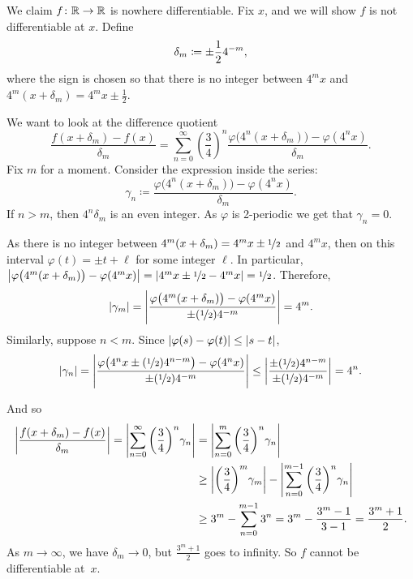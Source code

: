 \begin{example}
We claim $f \colon
{\mathbb{R}} \to {\mathbb{R}}$ is nowhere differentiable.
Fix $x$, and we will show $f$ is not differentiable at $x$.
Define
\begin{equation*}
\delta_m \coloneqq \pm \frac{1}{2} 4^{-m} ,
\avoidbreak
\end{equation*}
where the sign is chosen so that there is no integer
between $4^m x$ and $4^m(x+\delta_m) = 4^m x \pm \frac{1}{2}$.

We want to look at the difference quotient
\begin{equation*}
\frac{f(x+\delta_m)-f(x)}{\delta_m}
=
\sum_{n=0}^\infty 
{\left(\frac{3}{4}\right)}^n
\frac{\varphi\bigl(4^n(x+\delta_m)\bigr)-\varphi(4^nx)}{\delta_m} .
\end{equation*}
Fix $m$ for a moment.  Consider the expression inside the series:
\begin{equation*}
\gamma_{n} \coloneqq
\frac{\varphi\bigl(4^n(x+\delta_m)\bigr)-\varphi(4^nx)}{\delta_m} .
\end{equation*}
If $n > m$, then $4^n\delta_m$ is an even integer.  As $\varphi$
is 2-periodic we get that $\gamma_n = 0$.

As there is no integer between 
$4^m(x+\delta_m) = 4^m x\pm\nicefrac{1}{2}$ and $4^m x$, then on this interval
$\varphi(t) = \pm t + \ell$ for some integer $\ell$.
In particular,
$\left\lvert {\varphi\bigl(4^m(x+ \delta_m)\bigr)-\varphi(4^mx)} \right\rvert =
\left\lvert {4^mx\pm\nicefrac{1}{2}-4^mx} \right\rvert = \nicefrac{1}{2}$.  Therefore,
\begin{equation*}
\lvert {\gamma_m} \rvert =
\left\lvert {
\frac{\varphi\bigl(4^m(x+\delta_m)\bigr)-\varphi(4^mx)}{\pm (\nicefrac{1}{2}) 4^{-m}}
} \right\rvert
= 4^m .
\end{equation*}
Similarly, suppose $n < m$.  Since $\lvert {\varphi(s) -\varphi(t)} \rvert \leq
\lvert {s-t} \rvert$,
\begin{equation*}
\lvert {\gamma_n} \rvert =
\left\lvert {\frac{\varphi\bigl(4^nx\pm(\nicefrac{1}{2})4^{n-m}\bigr)-\varphi(4^nx)}{\pm
(\nicefrac{1}{2}) 4^{-m}}} \right\rvert
\leq
\left\lvert {\frac{\pm(\nicefrac{1}{2})4^{n-m}}{\pm (\nicefrac{1}{2}) 4^{-m}}} \right\rvert = 4^n
.
\end{equation*}

And so
\begin{equation*}
\begin{split}
\left\lvert {
\frac{f(x+\delta_m)-f(x)}{\delta_m}
} \right\rvert
=
\left\lvert {
\sum_{n=0}^\infty 
{\left(\frac{3}{4}\right)}^n
\gamma_n
} \right\rvert
& =
\left\lvert {
\sum_{n=0}^m 
{\left(\frac{3}{4}\right)}^n
\gamma_n
} \right\rvert
\\
& \geq
\left\lvert {
{\left(\frac{3}{4}\right)}^m
\gamma_m} \right\rvert
-
\left\lvert {
\sum_{n=0}^{m-1} 
{\left(\frac{3}{4}\right)}^n
\gamma_n
} \right\rvert
\\
& \geq
3^m
-
\sum_{n=0}^{m-1} 
3^n
=
3^m
-
\frac{3^{m}-1}{3-1}
=
\frac{3^m +1}{2} .
\end{split}
\end{equation*}
As $m \to \infty$, we have
$\delta_m \to 0$, but $\frac{3^m+1}{2}$
goes to infinity.  So $f$ cannot be differentiable at~$x$.
\end{example}

